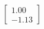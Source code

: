 \documentclass[preview]{standalone}
\begin{document}
\begin{align*}
\begin{bmatrix} 1.00 \\ -1.13 \end{bmatrix}
\end{align*}
\end{document}
